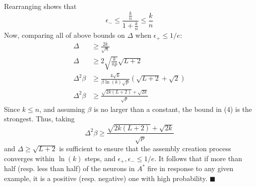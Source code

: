 \documentclass[final,12pt]{colt2022} %
\newcommand{\assmcore}[1]{{#1}^*}
\begin{document}
Rearranging shows that \[\epsilon_- \le \frac{\frac{k}{n}}{1 + \frac{k}{n}} \le \frac{k}{n}\] Now, comparing all of above bounds on $\Delta$ when $\epsilon_+ \le 1/e$: \begin{align}
    \Delta &\ge \frac{2k}{\sqrt{n}}\\
    \Delta &\ge 2\sqrt{\frac{k}{np}} \sqrt{L + 2}\\
    \Delta^2 \beta &\ge \frac{4\sqrt{k}}{\beta \ln(k) \sqrt{p}} \left(\sqrt{L + 2} + \sqrt{2}\right)\\
    \Delta^2 \beta &\ge \frac{\sqrt{2k(L + 2)} + \sqrt{2k}}{\sqrt{p}}
\end{align} Since $k \le n$, and assuming $\beta$ is no larger than a constant, the bound in (4) is the strongest. Thus, taking \[\Delta^2 \beta \ge \frac{\sqrt{2k(L + 2)} + \sqrt{2k}}{\sqrt{p}}\] and $\Delta \ge \sqrt{L + 2}$ is sufficient to ensure that the assembly creation process converges within $\ln(k)$ steps, and $\epsilon_+, \epsilon_- \le 1/e$. It follows that if more than half (resp. less than half) of the neurons in $\assmcore{A}$ fire in response to any given example, it is a positive (resp. negative) one with high probability. \hfill$\blacksquare$
\end{document}
